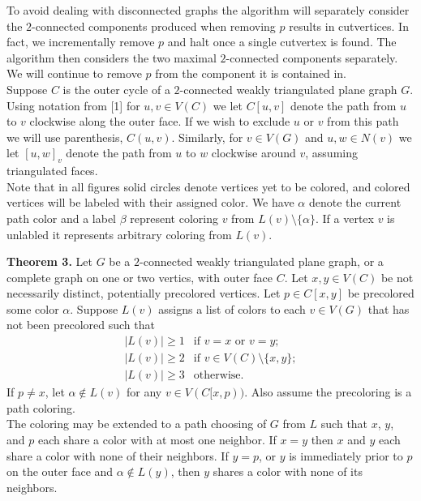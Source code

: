 \documentclass[11pt,letter]{article}
\begin{document}
\noindent To avoid dealing with disconnected graphs the algorithm will separately consider the $2$-connected
components produced when removing
$p$ results in cutvertices. In fact, we incrementally remove $p$ and halt once a single cutvertex is found.
The algorithm then
considers the two maximal $2$-connected components separately. We will continue to remove $p$ from the component
it is contained in.\\

\noindent Suppose $C$ is
the outer cycle of a $2$-connected weakly triangulated plane graph $G$. Using notation from [1] for $u,v\in V(C)$
we let $C[u,v]$ denote the path from $u$ to $v$ clockwise along the outer face. If we wish to exclude $u$ or $v$
from this path we will use parenthesis, $C(u,v)$. Similarly, for $v\in V(G)$ and
$u,w\in N(v)$ we let $[u,w]_v$ denote the path from $u$ to $w$ clockwise around $v$, assuming triangulated
faces.\\

\noindent Note that in all figures solid circles denote vertices yet to be colored, and colored vertices will
be labeled with their assigned color. We have $\alpha$ denote the current path color and a label $\beta$ represent
coloring $v$ from $L(v)\setminus\{\alpha\}$. If a vertex $v$ is unlabled it represents arbitrary coloring from
$L(v)$.\\

\begin{adjustwidth}{1.5em}{1.5em}
\noindent\textbf{Theorem 3.} Let $G$ be a $2$-connected weakly triangulated plane graph, or a complete graph
on one or two vertics, with outer face $C$. 
Let $x,y\in V(C)$ be not necessarily distinct, potentially precolored vertices. Let $p\in C[x,y]$ be precolored some
color $\alpha$. Suppose $L(v)$ assigns a list of colors to each $v\in V(G)$ that has not been precolored such that
\[
    \begin{array}{ll}
	    |L(v)|\ge 1 & \text{if } v=x \text{ or } v=y;\\
	    |L(v)|\ge 2 & \text{if } v\in V(C)\setminus\{x,y\};\\
	    |L(v)|\ge 3 & \text{otherwise.}
    \end{array}
\]
If $p\ne x$, let $\alpha\not\in L(v)$ for
any $v\in V(C[x,p))$. Also assume the precoloring is a path coloring.\\

\noindent The coloring may be extended to
a path choosing of $G$ from $L$ such that $x$, $y$, and $p$ each share a color with at most one neighbor. If
$x=y$ then $x$ and $y$ each share a color with none of their neighbors. If $y=p$, or $y$ is immediately prior to
$p$ on the outer face and $\alpha\not\in L(y)$, then $y$ shares a color with none of its neighbors.\\
\end{adjustwidth}
\end{document}
